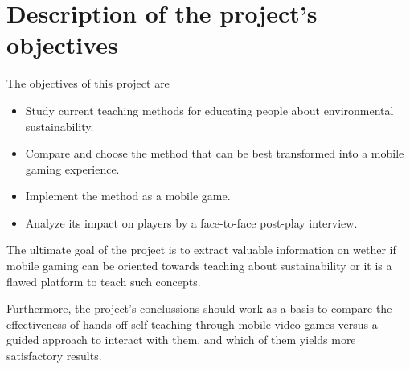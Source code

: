 \chapter{Description of the project's objectives}

The objectives of this project are

\begin{itemize}
\item Study current teaching methods for educating people about environmental sustainability.
\item Compare and choose the method that can be best transformed into a mobile gaming experience.
\item Implement the method as a mobile game.
\item Analyze its impact on players by a face-to-face post-play interview.
\end{itemize}

The ultimate goal of the project is to extract valuable information on wether
if mobile gaming can be oriented towards teaching about sustainability or it
is a flawed platform to teach such concepts.

Furthermore, the project's conclussions should work as a basis to compare
the effectiveness of hands-off self-teaching through mobile video games 
versus a guided approach to interact with them, and which of them yields more
satisfactory results.
